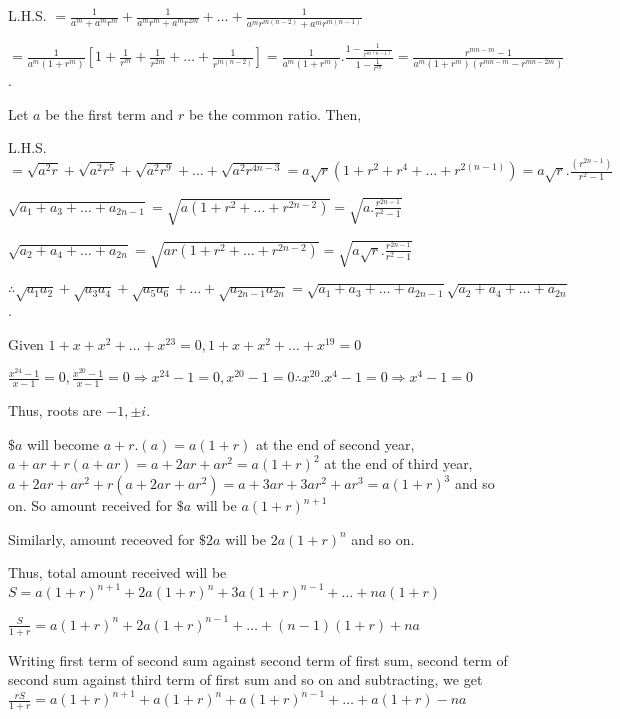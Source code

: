  L.H.S. $= \frac{1}{a^m + a^mr^m} + \frac{1}{a^mr^m + a^mr^{2m}} + \ldots + \frac{1}{a^mr^{m(n - 2)} +
    a^mr^{m(n - 1)}}$

  $= \frac{1}{a^m(1 + r^m)}\left[1 + \frac{1}{r^m} + \frac{1}{r^{2m}} + \ldots + \frac{1}{r^{m(n - 2)}}\right] =
  \frac{1}{a^m(1 + r^m)}.\frac{1 - \frac{1}{r^{m(n - 1)}}}{1 - \frac{1}{r^m}} = \frac{r^{mn - m} - 1}{a^m(1
    + r^m)(r^{mn - m} - r^{mn - 2m})}$.
\item Let $a$ be the first term and $r$ be the common ratio. Then,

  L.H.S. $= \sqrt{a^2r} + \sqrt{a^2r^5} + \sqrt{a^2r^9} + \ldots + \sqrt{a^2r^{4n - 3}} = a\sqrt{r}(1 + r^2
  + r^4 + \ldots + r^{2(n - 1)}) = a\sqrt{r}.\frac{(r^{2n - 1})}{r^2 - 1}$

  $\sqrt{a_1 + a_3 + \ldots + a_{2n - 1}} = \sqrt{a(1 + r^2 + \ldots + r^{2n - 2})} = \sqrt{a.\frac{r^{2n -
        1}}{r^2 - 1}}$

  $\sqrt{a_2 + a_4 + \ldots + a_{2n}} = \sqrt{ar(1 + r^2 + \ldots + r^{2n - 2})} =
  \sqrt{a\sqrt{r}.\frac{r^{2n - 1}}{r^2 - 1}}$

  $\therefore \sqrt{a_1a_2} + \sqrt{a_3a_4} + \sqrt{a_5a_6} + \ldots + \sqrt{a_{2n - 1}a_{2n}} = \sqrt{a_1 +
    a_3 + \ldots + a_{2n - 1}}\sqrt{a_2 + a_4 + \ldots + a_{2n}}$.
\item Given $1 + x + x^2 + \ldots + x^{23} = 0, 1 + x + x^2 + \ldots + x^{19} = 0$

  $\frac{x^{24} - 1}{x - 1} = 0, \frac{x^{20} - 1}{x - 1} = 0\Rightarrow x^{24} - 1 = 0, x^{20} - 1 = 0\therefore x^{20}.x^4 - 1 = 0 \Rightarrow x^4 - 1 = 0$

  Thus, roots are $-1, \pm i$.
\item $\$a$ will become $a + r.(a) = a(1 + r)$ at the end of second year, $a + ar + r(a + ar) = a + 2ar + ar^2 = a(1
  + r)^2$ at the end of third year, $a + 2ar + ar^2 + r(a + 2ar + ar^2) = a + 3ar + 3ar^2 + ar^3 = a(1 + r)^3$ and so on. So
  amount received for $\$a$ will be $a(1 + r)^{n + 1}$

  Similarly, amount receoved for $\$2a$ will be $2a(1 + r)^n$ and so on.

  Thus, total amount received will be $S = a(1 + r)^{n + 1} + 2a(1 + r)^n + 3a(1 + r)^{n - 1} + \ldots + na(1 + r)$

  $\frac{S}{1 + r} = a(1 + r)^n + 2a(1 + r)^{n - 1} + \ldots + (n - 1)(1 + r) + na$

  Writing first term of second sum against second term of first sum, second term of second sum against third term of first sum and
  so on and subtracting, we get $\frac{rS}{1 + r} = a(1 + r)^{n + 1} + a(1 + r)^{n} + a(1 + r)^{n - 1} + \ldots + a(1 + r) - na$

